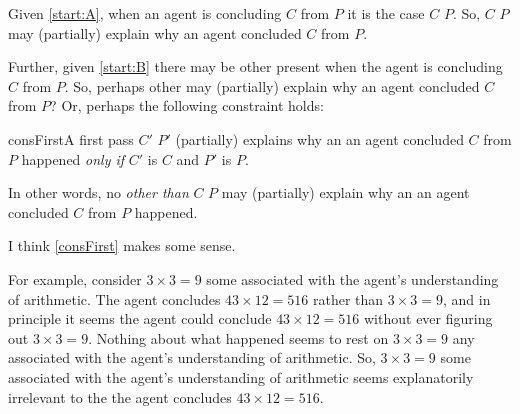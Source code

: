 



\begin{note}
  Given \ref{start:A}, when an agent is concluding \(C\) from \(P\) it is the case \(C\) \fof{} \(P\).
  So, \(C\)  \(P\) may (partially) explain why an agent concluded \(C\) from \(P\).

  Further, given \ref{start:B} there may be other \fingfr{} present when the agent is concluding \(C\) from \(P\).
  So, perhaps other  may (partially) explain why an agent concluded \(C\) from \(P\)?
  Or, perhaps the following constraint holds:

  \begin{constraint}{consFirst}{A first pass}
    \(C'\) \fingfr{} \(P'\) (partially) explains why an  an agent concluded \(C\) from \(P\) happened \emph{only if} \(C'\) is \(C\) and \(P'\) is \(P\).
  \end{constraint}

  \noindent%
  In other words, no \fingfr{} \emph{other than} \(C\) \fingf{} \(P\) may (partially) explain why an  an agent concluded \(C\) from \(P\) happened.
\end{note}


\begin{note}
  I think \autoref{consFirst} makes some sense.

  For example, consider \(3 \times 3 = 9\) \fingf{} some \pool{} associated with the agent's understanding of arithmetic.
  The agent concludes \(43 \times 12 = 516\) rather than \(3 \times 3 = 9\), and in principle it seems the agent could conclude \(43 \times 12 = 516\) without ever figuring out \(3 \times 3 = 9\).
  Nothing about what happened seems to rest on \(3 \times 3 = 9\) \fingf{} any \pool{} associated with the agent's understanding of arithmetic.
  So, \(3 \times 3 = 9\) \fingf{} some \pool{} associated with the agent's understanding of arithmetic seems explanatorily irrelevant to the \eiw{} the agent concludes \(43 \times 12 = 516\).
\end{note}


